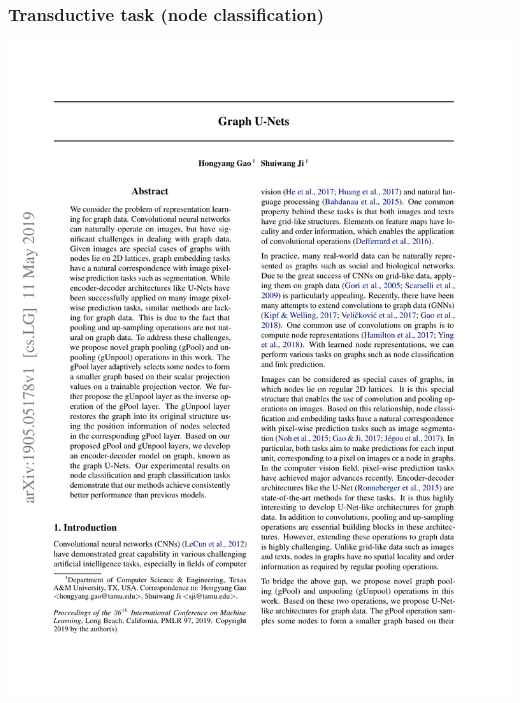 \documentclass[12pt,aspectratio=169]{beamer}
\begin{document}
    \begin{frame}
        \frametitle{Transductive task (node classification)}

        \centering
        \includegraphics[page=7,trim=1cm 21.2cm 1cm 2.5cm,clip,scale=0.7]{Graph U-Net.pdf}
    \end{frame}
\end{document}
